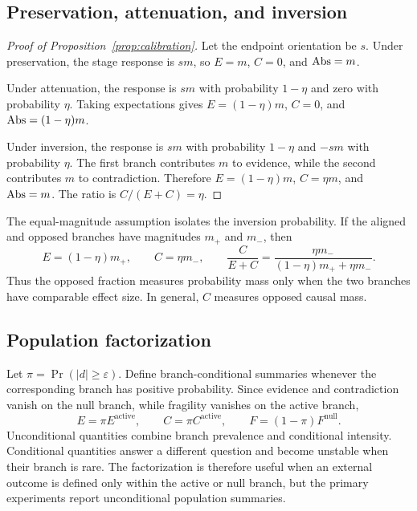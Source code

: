 \subsection{Preservation, attenuation, and inversion}

\begin{proof}[Proof of Proposition~\ref{prop:calibration}]
Let the endpoint orientation be $s$. Under preservation, the stage response is $sm$, so $E=m$, $C=0$, and $\mathrm{Abs}=m$.

Under attenuation, the response is $sm$ with probability $1-\eta$ and zero with probability $\eta$. Taking expectations gives $E=(1-\eta)m$, $C=0$, and $\mathrm{Abs}=(1-\eta)m$.

Under inversion, the response is $sm$ with probability $1-\eta$ and $-sm$ with probability $\eta$. The first branch contributes $m$ to evidence, while the second contributes $m$ to contradiction. Therefore $E=(1-\eta)m$, $C=\eta m$, and $\mathrm{Abs}=m$. The ratio is $C/(E+C)=\eta$.
\end{proof}

The equal-magnitude assumption isolates the inversion probability. If the aligned and opposed branches have magnitudes $m_{+}$ and $m_{-}$, then
\begin{equation}
    E=(1-\eta)m_{+},
    \qquad
    C=\eta m_{-},
    \qquad
    \frac{C}{E+C}=\frac{\eta m_{-}}{(1-\eta)m_{+}+\eta m_{-}}.
    \label{eq:unequal-inversion}
\end{equation}
Thus the opposed fraction measures probability mass only when the two branches have comparable effect size. In general, $C$ measures opposed causal mass.


\subsection{Population factorization}
\label{app:population-factorization}

Let $\pi=\Pr(|d|\geq\varepsilon)$. Define branch-conditional summaries whenever the corresponding branch has positive probability. Since evidence and contradiction vanish on the null branch, while fragility vanishes on the active branch,
\begin{equation}
    E=\pi E^{\mathrm{active}},
    \qquad
    C=\pi C^{\mathrm{active}},
    \qquad
    F=(1-\pi)F^{\mathrm{null}}.
    \label{eq:population-factorization}
\end{equation}
Unconditional quantities combine branch prevalence and conditional intensity. Conditional quantities answer a different question and become unstable when their branch is rare. The factorization is therefore useful when an external outcome is defined only within the active or null branch, but the primary experiments report unconditional population summaries.

